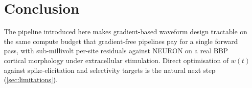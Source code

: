 \section{Conclusion}\label{sec:conclusion}

The pipeline introduced here makes gradient-based waveform design
tractable on the same compute budget that gradient-free pipelines pay
for a single forward pass, with sub-millivolt per-site residuals
against NEURON on a real BBP cortical morphology under extracellular
stimulation. Direct optimisation of $w(t)$ against
spike-elicitation and selectivity targets is the natural next step
(\cref{sec:limitations}).
